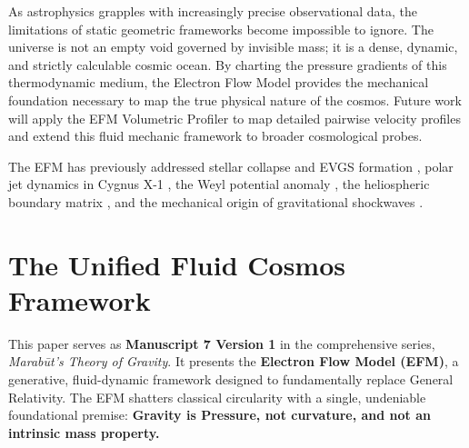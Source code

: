 \documentclass[11pt, a4paper]{article}
\begin{document}
As astrophysics grapples with increasingly precise observational data, the limitations of static geometric frameworks become impossible to ignore. The universe is not an empty void governed by invisible mass; it is a dense, dynamic, and strictly calculable cosmic ocean. By charting the pressure gradients of this thermodynamic medium, the Electron Flow Model provides the mechanical foundation necessary to map the true physical nature of the cosmos. Future work will apply the EFM Volumetric Profiler to map detailed pairwise velocity profiles and extend this fluid mechanic framework to broader cosmological probes.

The EFM has previously addressed stellar collapse and EVGS formation \cite{marabut2026m4}, polar jet dynamics in Cygnus X-1 \cite{marabut2026m3}, the Weyl potential anomaly \cite{marabut2026m2}, the heliospheric boundary matrix \cite{marabut2026m5}, and the mechanical origin of gravitational shockwaves \cite{marabut2026m6}. 

\clearpage
\section*{The Unified Fluid Cosmos Framework}
  This paper serves as \textbf{Manuscript 7 Version 1} in the comprehensive series, \textit{Marab\={u}t's Theory of Gravity}. It presents the \textbf{Electron Flow Model (EFM)}, a generative, fluid-dynamic framework designed to fundamentally replace General Relativity. The EFM shatters classical circularity with a single, undeniable foundational premise: \textbf{Gravity is Pressure, not curvature, and not an intrinsic mass property.}
\end{document}
